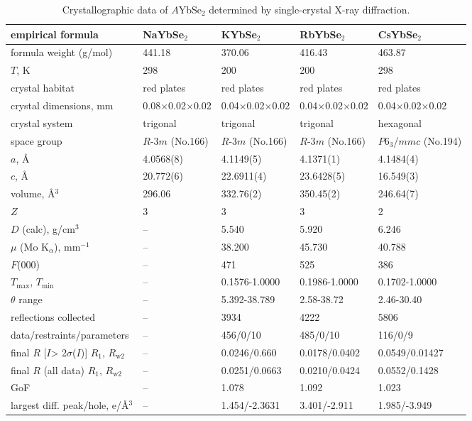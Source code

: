 \documentclass[%
 aip,
 amsmath,amssymb,
 reprint,%
]{revtex4-1}
\begin{document}
\begin{table*}[tbh]
\caption{\label{tab:crys}Crystallographic data of $A$YbSe$_2$ determined by single-crystal X-ray diffraction. }

\begin{tabular}{|p{4cm}|p{3cm}|p{3cm}|p{3cm}|p{3cm}|}
\hline
empirical formula&	NaYbSe$_2$~\cite{liu2018rare}	&KYbSe$_2$	&RbYbSe$_2$	&CsYbSe$_2$~\cite{xing2019}\\
\hline
formula weight (g/mol)&	441.18&	370.06&	416.43&	463.87\\
\hline
$T$, K&	298&	200	&200&	298\\
\hline
crystal habitat&	red plates&	red plates	&red plates	&red plates\\
\hline
crystal dimensions, mm&	0.08$\times$0.02$\times$0.02&	0.04$\times$0.02$\times$0.02&	0.04$\times$0.02$\times$0.02	&0.04$\times$0.02$\times$0.02\\
\hline
crystal system&	trigonal&	trigonal&	trigonal&	hexagonal\\
\hline
space group&	$R$-3$m$ (No.166)&	$R$-3$m$ (No.166)&	$R$-3$m$ (No.166)&	$P$6$_3$/$mmc$ (No.194)\\
\hline
$a$, \AA&	4.0568(8)&	4.1149(5)&	4.1371(1)&	4.1484(4)\\
\hline
$c$, \AA&	20.772(6)&	22.6911(4)&	23.6428(5)	&16.549(3)\\
\hline
volume, \AA$^3$&	296.06	&332.76(2)&	350.45(2)&	246.64(7)\\
\hline
$Z$&	3&	3&	3&	2\\
\hline
$D$ (calc), g/cm$^3$&	–&	5.540&	5.920&	6.246\\
\hline
$\mu$ (Mo K$_\alpha$), mm$^{-1}$	&–&	38.200&	45.730&	40.788\\
\hline
$F$(000)&	–&	471	&525&	386\\
\hline
$T_\mathrm{max}$, $T_\mathrm{min}$&	–&	0.1576-1.0000&	0.1986-1.0000&	0.1702-1.0000\\
\hline
$\theta$ range&	–&	5.392-38.789&	2.58-38.72&	2.46-30.40\\
\hline
reflections collected&	–&	3934&	4222&	5806\\
\hline
data/restraints/parameters&	–&	456/0/10&	485/0/10&	116/0/9\\
\hline
final $R$ [$I$> 2$\sigma$($I$)] $R_\mathrm{1}$, $R_\mathrm{w2}$&	–	&0.0246/0.660&	0.0178/0.0402&	0.0549/0.01427\\
\hline
final $R$ (all data) $R_\mathrm{1}$, $R_\mathrm{w2}$&	–&	0.0251/0.0663&	0.0210/0.0424&	0.0552/0.1428\\
\hline
GoF	&–&	1.078&	1.092	&1.023\\
\hline
largest diff. peak/hole, e/\AA$^3$&	–	&1.454/-2.3631&	3.401/-2.911&	1.985/-3.949\\
\hline
\end{tabular}
\label{Tab1}
\end{table*}
\end{document}
